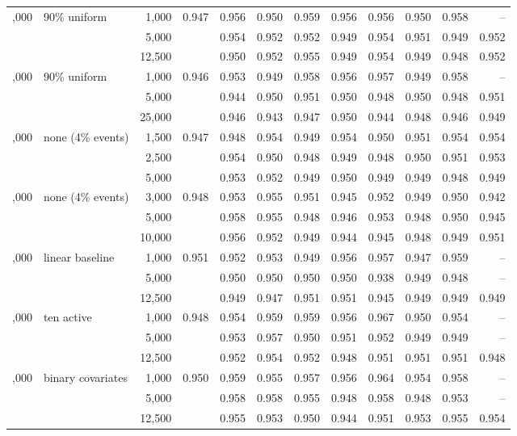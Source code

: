 \begin{tabular}{rlrrrrrrrrrr}
\addlinespace
25,000 & 90\% uniform & 1,000 & 0.947 & 0.956 & 0.950 & 0.959 & 0.956 & 0.956 & 0.950 & 0.958 & --\\
 &  & 5,000 &  & 0.954 & 0.952 & 0.952 & 0.949 & 0.954 & 0.951 & 0.949 & 0.952\\
 &  & 12,500 &  & 0.950 & 0.952 & 0.955 & 0.949 & 0.954 & 0.949 & 0.948 & 0.952\\
\addlinespace
50,000 & 90\% uniform & 1,000 & 0.946 & 0.953 & 0.949 & 0.958 & 0.956 & 0.957 & 0.949 & 0.958 & --\\
 &  & 5,000 &  & 0.944 & 0.950 & 0.951 & 0.950 & 0.948 & 0.950 & 0.948 & 0.951\\
 &  & 25,000 &  & 0.946 & 0.943 & 0.947 & 0.950 & 0.944 & 0.948 & 0.946 & 0.949\\
\addlinespace
25,000 & none (4\% events) & 1,500 & 0.947 & 0.948 & 0.954 & 0.949 & 0.954 & 0.950 & 0.951 & 0.954 & 0.954\\
 &  & 2,500 &  & 0.954 & 0.950 & 0.948 & 0.949 & 0.948 & 0.950 & 0.951 & 0.953\\
 &  & 5,000 &  & 0.953 & 0.952 & 0.949 & 0.950 & 0.949 & 0.949 & 0.948 & 0.949\\
\addlinespace
50,000 & none (4\% events) & 3,000 & 0.948 & 0.953 & 0.955 & 0.951 & 0.945 & 0.952 & 0.949 & 0.950 & 0.942\\
 &  & 5,000 &  & 0.958 & 0.955 & 0.948 & 0.946 & 0.953 & 0.948 & 0.950 & 0.945\\
 &  & 10,000 &  & 0.956 & 0.952 & 0.949 & 0.944 & 0.945 & 0.948 & 0.949 & 0.951\\
\addlinespace
25,000 & linear baseline & 1,000 & 0.951 & 0.952 & 0.953 & 0.949 & 0.956 & 0.957 & 0.947 & 0.959 & --\\
 &  & 5,000 &  & 0.950 & 0.950 & 0.950 & 0.950 & 0.938 & 0.949 & 0.948 & --\\
 &  & 12,500 &  & 0.949 & 0.947 & 0.951 & 0.951 & 0.945 & 0.949 & 0.949 & 0.949\\
\addlinespace
25,000 & ten active & 1,000 & 0.948 & 0.954 & 0.959 & 0.959 & 0.956 & 0.967 & 0.950 & 0.954 & --\\
 &  & 5,000 &  & 0.953 & 0.957 & 0.950 & 0.951 & 0.952 & 0.949 & 0.949 & --\\
 &  & 12,500 &  & 0.952 & 0.954 & 0.952 & 0.948 & 0.951 & 0.951 & 0.951 & 0.948\\
\addlinespace
25,000 & binary covariates & 1,000 & 0.950 & 0.959 & 0.955 & 0.957 & 0.956 & 0.964 & 0.954 & 0.958 & --\\
 &  & 5,000 &  & 0.958 & 0.958 & 0.955 & 0.948 & 0.958 & 0.948 & 0.953 & --\\
 &  & 12,500 &  & 0.955 & 0.953 & 0.950 & 0.944 & 0.951 & 0.953 & 0.955 & 0.954\\
\bottomrule
\end{tabular}
